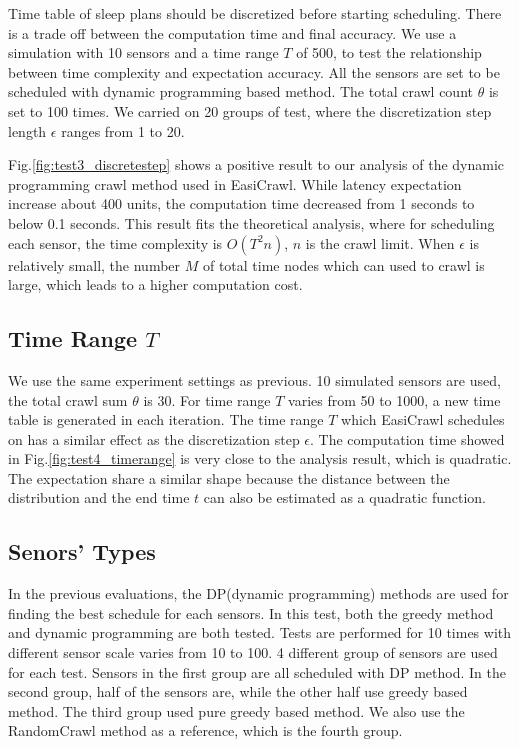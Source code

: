 \documentclass[conference]{IEEEtran}
\begin{document}
Time table of sleep plans should be discretized before starting scheduling. There is a trade off between the computation time and final accuracy. 
We use a simulation with 10 sensors and a time range $T$ of 500, to test the relationship between time complexity and expectation accuracy. All the sensors are set to be scheduled with dynamic programming based method. The total crawl count $\theta$ is set to 100 times.
We carried on 20 groups of test, where the discretization step length $\epsilon$ ranges from 1 to 20.


Fig.\ref{fig:test3_discretestep} shows a positive result to our analysis of the dynamic programming crawl method used in EasiCrawl. While latency expectation increase about 400 units, the computation time decreased from 1 seconds to below 0.1 seconds. This result fits the theoretical analysis, where for scheduling each sensor, the time complexity is $O(T^{2}n)$, $n$ is the crawl limit.
When $\epsilon$ is relatively small, the number $M$ of total time nodes which can used to crawl is large, which leads to a higher computation cost.

\subsection{Time Range $T$}

We use the same experiment settings as previous. 10 simulated sensors are used, the total crawl sum $\theta$ is 30. For time range $T$ varies from 50 to 1000, a new time table is generated in each iteration. The time range $T$ which EasiCrawl schedules on has a similar effect as the discretization step $\epsilon$. 
The computation time showed in Fig.\ref{fig:test4_timerange} is very close to the analysis result, which is quadratic. The expectation share a similar shape because the distance between the distribution and the end time $t$ can also be estimated as a quadratic function.

\subsection{Senors' Types}

In the previous evaluations, the DP(dynamic programming) methods are used for finding the best schedule for each sensors. In this test, both the greedy method and dynamic programming are both tested. 
Tests are performed for 10 times with different sensor scale varies from 10 to 100. 4 different group of sensors are used for each test. Sensors in the first group are all scheduled with DP method. In the second group, half of the sensors are, while the other half use greedy based method. The third group used pure greedy based method. We also use the RandomCrawl method as a reference, which is the fourth group.
\end{document}
